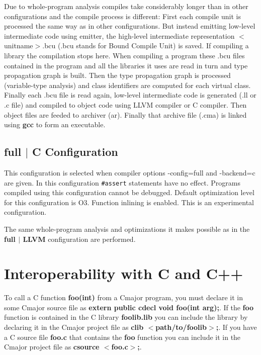 \documentclass[oneside, a4paper, 11pt]{article}
\begin{document}
Due to whole-program analysis compiles take considerably longer than in other configurations and the compile process is different:
First each compile unit is processed the same way as in other configurations.
But instead emitting low-level intermediate code using emitter, the high-level intermediate representation $<$unitname$>$.bcu
(.bcu stands for Bound Compile Unit) is saved. If compiling a library the compilation stops here.
When compiling a program these .bcu files contained in the program and all the libraries it uses are read in turn
and type propagation graph is built. Then the type propagation graph is processed (variable-type analysis) and class identifiers are computed for each
virtual class. Finally each .bcu file is read again, low-level intermediate code is generated (.ll or .c file) and
compiled to object code using LLVM compiler or C compiler. Then object files are feeded to archiver (ar).
Finally that archive file (.cma) is linked using \textbf{gcc} to form an executable.

\subsection{full $|$ C Configuration}

This configuration is selected when compiler options -config=full and -backend=c are given. In this configuration \verb|#assert| statements have no effect.
Programs compiled using this configuration cannot be debugged. Default optimization level for this configuration is O3. Function inlining is enabled.
This is an experimental configuration.

The same whole-program analysis and optimizations it makes possible as in the \textbf{full $|$ LLVM} configuration are performed.

\section{Interoperability with C and C++}

To call a C function \textbf{foo(int)} from a Cmajor program, you must declare it in some Cmajor source file as
\textbf{extern public cdecl void foo(int arg);}.
If the \textbf{foo} function is contained in the C library \textbf{foolib.lib} you can
include the library by declaring it in the Cmajor project file as \textbf{clib $<$path/to/foolib$>$;}.
If you have a C source file \textbf{foo.c} that contains the \textbf{foo} function
you can include it in the Cmajor project file as \textbf{csource $<$foo.c$>$;}.
\end{document}
